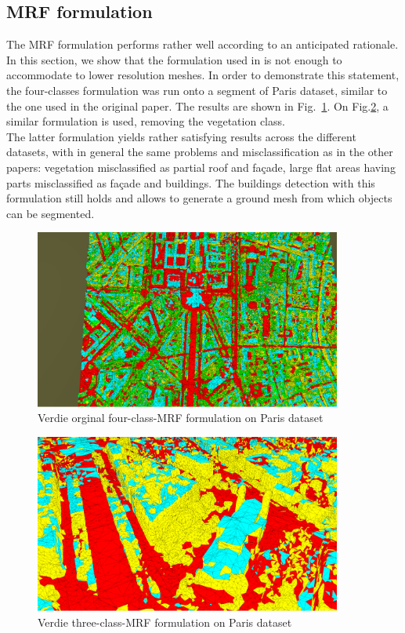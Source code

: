 \documentclass{kththesis}
\begin{document}
\subsection{MRF formulation}
The MRF formulation performs rather well according to an anticipated rationale. In this section, we show that the formulation used in \textcite{verdie} is not enough to accommodate to lower resolution meshes. In order to demonstrate this statement, the four-classes formulation was run onto a segment of Paris dataset, similar to the one used in the original paper. The results are shown in Fig.~\ref{fig:paris_verdie_mrf4}. On Fig.\ref{fig:paris_verdie_mrf3}, a similar formulation is used, removing the vegetation class. \\
The latter formulation yields rather satisfying results across the different datasets, with in general the same problems and misclassification as in the other papers: vegetation misclassified as partial roof and façade, large flat areas having parts misclassified as façade and buildings. The buildings detection with this formulation still holds and allows to generate a ground mesh from which objects can be segmented. 

\begin{figure}[H]
    \centering
    \includegraphics[width=0.9\textwidth]{images/MRF_res/paris_4class_verdie.png}
    \caption{Verdie orginal four-class-MRF formulation on Paris dataset}
    \label{fig:paris_verdie_mrf4}
\end{figure}
\begin{figure}[H]
    \centering
    \includegraphics[width=0.9\textwidth]{images/MRF_res/paris_3class_verdie.png}
    \caption{Verdie three-class-MRF formulation on Paris dataset}
    \label{fig:paris_verdie_mrf3}
\end{figure}
 
\end{document}
